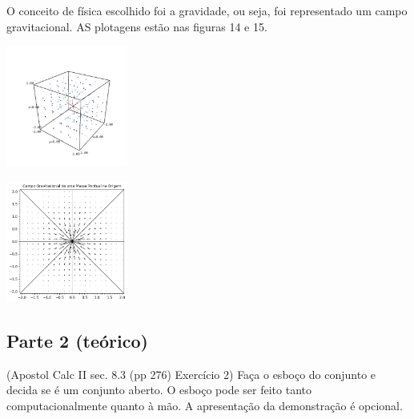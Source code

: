 \documentclass[../main.tex]{subfiles}
\begin{document}
		\begin{solucao}
			O conceito de física escolhido foi a gravidade, ou seja, foi representado um campo gravitacional. AS plotagens estão nas figuras 14 e 15.
			
			\begin{center}
				\includegraphics[width=0.3\textwidth]{imagens/lista03/picture_lista03_q04.jpg}
			\end{center}
			
			\begin{center}
				\includegraphics[width=0.3\textwidth]{imagens/lista03/picture_lista03_q04.png.jpg}
			\end{center}
		\end{solucao}
		\subsection{Parte 2 (teórico)}
		\begin{exercicio}{1}
			(Apostol Calc II sec. 8.3 (pp 276) Exercício 2)
			Faça o esboço do conjunto e decida se é um conjunto aberto. O esboço pode ser feito tanto computacionalmente quanto à mão. A apresentação da demonstração é opcional.
		\end{exercicio}
		
\end{document}
